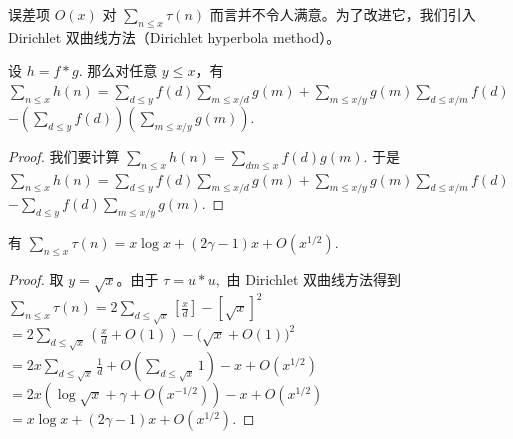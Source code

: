

误差项 $O(x)$ 对
\(\textstyle \sum_{n\leq\allowbreak{} x}\tau(n)\)
而言并不令人满意。为了改进它，我们引入 Dirichlet 双曲线方法（Dirichlet hyperbola method）。



\begin{theorem}
	设
	\(\textstyle h=\allowbreak{}f*g.\)
	那么对任意 $y\leq x$，有
	\(\textstyle \sum_{n\leq\allowbreak{} x}h(n) =\allowbreak{}{} \sum_{d\leq\allowbreak{} y}f(d)\sum_{m\leq\allowbreak{} x/d}g(m) +\allowbreak{} \sum_{m\leq\allowbreak{} x/y}g(m)\sum_{d\leq\allowbreak{} x/m}f(d)\) \(\textstyle - \left(\sum_{d\leq\allowbreak{} y}f(d)\right) \left(\sum_{m\leq\allowbreak{} x/y}g(m)\right).\)
\end{theorem}

\begin{proof}
	我们要计算
	\(\textstyle \sum_{n\leq\allowbreak{} x}h(n) =\allowbreak{} \sum_{dm\leq\allowbreak{} x}f(d)g(m).\)
	于是
	\(\textstyle \sum_{n\leq\allowbreak{} x}h(n) =\allowbreak{}{} \sum_{d\leq\allowbreak{} y}f(d)\sum_{m\leq\allowbreak{} x/d}g(m) +\allowbreak{} \sum_{m\leq\allowbreak{} x/y}g(m)\sum_{d\leq\allowbreak{} x/m}f(d)\) \(\textstyle - \sum_{d\leq\allowbreak{} y}f(d)\sum_{m\leq\allowbreak{} x/y}g(m).\)
\end{proof}

\begin{theorem}[原文 Theorem 4]
	有
	\(\textstyle \sum_{n\leq\allowbreak{} x}\tau(n) =\allowbreak{} x\log x+\allowbreak{}(2\gamma-1)x+\allowbreak{}O(x^{1/2}).\)
\end{theorem}

\begin{proof}
	取 $y=\sqrt{x}$。由于
	\(\textstyle \tau=\allowbreak{}u*u,\allowbreak{}\)
	由 Dirichlet 双曲线方法得到
	\(\textstyle \sum_{n\leq\allowbreak{} x}\tau(n) =\allowbreak{} 2\sum_{d\leq\allowbreak{} \sqrt{x}}\left[\frac xd\right]-[\sqrt{x}]^2\) \(\textstyle =\allowbreak{} 2\sum_{d\leq\allowbreak{} \sqrt{x}}\left(\frac xd+\allowbreak{}O(1)\right) -\bigl(\sqrt{x}+\allowbreak{}O(1)\bigr)^2\) \(\textstyle =\allowbreak{} 2x\sum_{d\leq\allowbreak{} \sqrt{x}}\frac1d +\allowbreak{}O\left(\sum_{d\leq\allowbreak{} \sqrt{x}}1\right) -x+\allowbreak{}O(x^{1/2})\) \(\textstyle =\allowbreak{} 2x\left(\log\sqrt{x}+\allowbreak{}\gamma+\allowbreak{}O(x^{-1/2})\right) -x+\allowbreak{}O(x^{1/2})\) \(\textstyle =\allowbreak{} x\log x+\allowbreak{}(2\gamma-1)x+\allowbreak{}O(x^{1/2}).\)
\end{proof}

